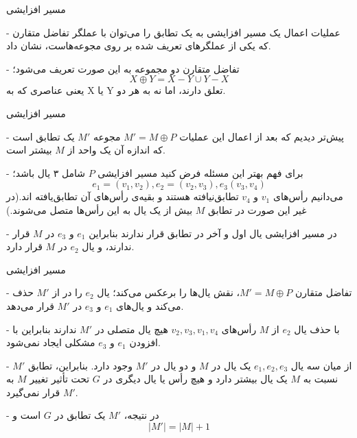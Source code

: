 \begin{itemframe}{مسیر افزایشی}

\item[-]
عملیات اعمال یک مسیر افزایشی به یک تطابق را می‌توان با عملگر تفاضل متقارن
 که یکی از عملگرهای تعریف شده بر روی مجوعه‌هاست، نشان داد.
\item[-]
تفاضل متقارن دو مجموعه به این صورت تعریف می‌شود؛
$$ X \oplus Y = X - Y \cup Y - X$$
یعنی عناصری که به X یا Y تعلق دارند، اما نه به هر دو.
\end{itemframe}


\begin{itemframe}{مسیر افزایشی}
\item[-]
پیش‌تر دیدیم که بعد از اعمال این عملیات
$M' = M \oplus P$
مجوعه $M' $ یک تطابق است که اندازه آن یک واحد از $M$ بیشتر است.
\item[-]
برای فهم بهتر این مسئله  فرض کنید مسیر افزایشی $P$ شامل ۳ یال باشد؛
$$ e_1=(v_1, v_2), e_2=(v_2, v_3), e_3(v_3, v_4)$$
می‌دانیم رأس‌های
$v_1$ و
$v_4$
تطابق‌نیافته هستند و بقیه‌ی رأس‌های آن تطابق‌یافته ‌اند.(در غیر این ‌صورت در تطابق $M$ بیش از یک یال به این رأس‌ها
متصل می‌شوند.)

\item[-]
در مسیر افزایشی یال اول و آخر در تطابق قرار ندارند بنابراین
$e_1$ و
$e_3$
در $M$ قرار ندارند، و یال
$e_2$
در $M$ قرار دارد.
\end{itemframe}


\begin{itemframe}{مسیر افزایشی}
\item[-]
تفاضل متقارن $M' = M \oplus P$، نقش یال‌ها را برعکس می‌کند؛ یال
$e_2$
را در از $M'$ حذف می‌کند و یال‌های
$e_1$ و
$e_3$
در $M'$ قرار می‌دهد.
\item[-]
با حذف یال
$e_2$
از $M$ رأس‌های
$v_2, v_3, v_1, v_4$
هیچ یال متصلی در $M'$  ندارند بنابراین با افزودن
$e_1$ و
$e_3$
مشکلی ایجاد نمی‌شود.
\item[-]
از میان سه یال
$e_1, e_2, e_3$
یک یال در $M$ و دو یال در $M'$ وجود دارد. بنابراین، تطابق $M'$ نسبت به $M$ یک یال بیشتر دارد و هیچ رأس یا یال دیگری در $G$ تحت تأثیر تغییر $M$ به $M'$ قرار نمی‌گیرد.
\item[-]
در نتیجه، $M'$ یک تطابق در $G$ است و
$$|M'| = |M| + 1$$

\end{itemframe}


